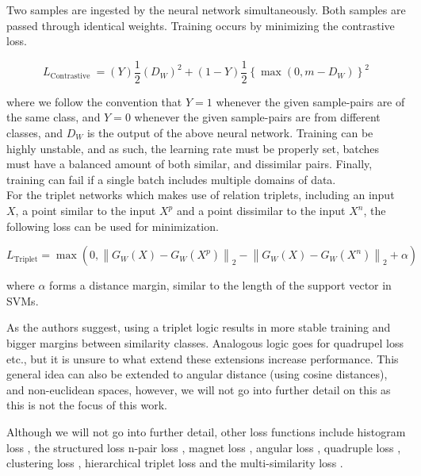 \documentclass[a4paper,12pt,twoside,openright]{report}
\begin{document}
Two samples are ingested by the neural network simultaneously.
Both samples are passed through identical weights.
Training occurs by minimizing the contrastive loss.

\begin{equation}
L_{\text {Contrastive }}=(Y) \frac{1}{2}\left(D_{W}\right)^{2}+(1-Y) \frac{1}{2}\left\{\max \left(0, m-D_{W}\right)\right\}^{2}
\end{equation}

where we follow the convention that $Y=1$ whenever the given sample-pairs are of the same class, and $Y=0$ whenever the given sample-pairs are from different classes, and $D_W$ is the output of the above neural network.
Training can be highly unstable, and as such, the learning rate must be properly set, batches must have a balanced amount of both similar, and dissimilar pairs. 
Finally, training can fail if a single batch includes multiple domains of data. \\

For the triplet networks \cite{hoffer14} which makes use of relation triplets, including an input $X$, a point similar to the input $X^p$ and a point dissimilar to the input $X^n$, the following loss can be used for minimization.

\begin{equation}
L_{\text {Triplet}}=\max \left(0,\left\|G_{W}(X)-G_{W}\left(X^{p}\right)\right\|_{2}-\left\|G_{W}(X)-G_{W}\left(X^{n}\right)\right\|_{2}+\alpha\right)
\end{equation} 

where $\alpha$ forms a distance margin, similar to the length of the support vector in SVMs.

As the authors suggest, using a triplet logic results in more stable training and bigger margins between similarity classes.
Analogous logic goes for quadrupel loss etc., but it is unsure to what extend these extensions increase performance.
This general idea can also be extended to angular distance (using cosine distances), and non-euclidean spaces, however, we will not go into further detail on this as this is not the focus of this work.

Although we will not go into further detail, other loss functions include histogram loss \cite{ustinova16}, the structured loss \cite{song16} n-pair loss \cite{sohn16}, magnet loss \cite{rippel16}, angular loss \cite{wang17}, quadruple loss \cite{ni17}, clustering loss \cite{song17}, hierarchical triplet loss \cite{ge18} and the multi-similarity loss \cite{wang19c}.
\end{document}
